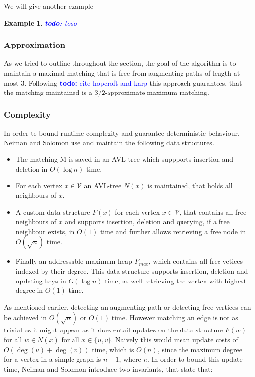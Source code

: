 \documentclass{article}      %
\newcommand\todo[1]{\textcolor{blue}{\textbf{todo: }#1}}
\newtheorem{example}{Example}[subsection]
\begin{document}
We will give another example 

\begin{example}
\todo{todo}
\end{example}

\subsubsection{Approximation}
\label{sec:ns-approx}

As we tried to outline throughout the section, the goal of the algorithm is to maintain a maximal matching that is free from augmenting paths of length at most 3. Following \todo{cite hopcroft and karp} this approach guarantees, that the matching maintained is a $3/2$-approximate maximum matching.

\subsubsection{Complexity}
\label{sec:ns-complx}

In order to bound runtime complexity and guarantee deterministic behaviour, Neiman and Solomon use and maintain the following data structures. 

\begin{itemize}
\item The matching M is saved in an AVL-tree which suppports insertion and deletion in $O(\log n)$ time.
\item For each vertex $x \in \mathcal{V}$ an AVL-tree $N(x)$ is maintained, that holds all neighbours of $x$.
\item A custom data structure $F(x)$ for each vertex $x \in \mathcal{V}$, that contains all free neighbours of $x$ and supports insertion, deletion and querying, if a free neighbour exists, in $O(1)$ time and further allows retrieving a free node in $O(\sqrt{n})$ time.
\item Finally an addressable maximum heap $F_{max}$, which contains all free vetices indexed by their degree. This data structure supports insertion, deletion and updating keys in $O(\log n)$ time, as well retrieving the vertex with highest degree in $O(1)$ time.
\end{itemize}

\noindent
As mentioned earlier, detecting an augmenting path or detecting free vertices can be achieved in $O(\sqrt{n})$ or $O(1)$ time. However matching an edge is not as trivial as it might appear as it does entail updates on the data structure $F(w)$ for all $w \in N(x)$ for all $x \in \{u,v\}$. Naively this would mean update costs of $O(\deg(u) + \deg(v))$ time, which is $O(n)$, since the maximum degree for a vertex in a simple graph is $n-1$, where $n$. In order to bound this update time, Neiman and Solomon introduce two invariants, that state that:
\end{document}
